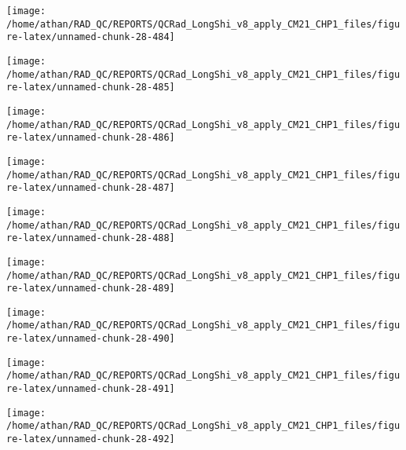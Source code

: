 \documentclass[
  10pt,
  a4paper,oneside]{article}
\begin{document}
\begin{center}\texttt{[image: /home/athan/RAD\_QC/REPORTS/QCRad\_LongShi\_v8\_apply\_CM21\_CHP1\_files/figure-latex/unnamed-chunk-28-484]} \end{center}

\begin{center}\texttt{[image: /home/athan/RAD\_QC/REPORTS/QCRad\_LongShi\_v8\_apply\_CM21\_CHP1\_files/figure-latex/unnamed-chunk-28-485]} \end{center}

\begin{center}\texttt{[image: /home/athan/RAD\_QC/REPORTS/QCRad\_LongShi\_v8\_apply\_CM21\_CHP1\_files/figure-latex/unnamed-chunk-28-486]} \end{center}

\begin{center}\texttt{[image: /home/athan/RAD\_QC/REPORTS/QCRad\_LongShi\_v8\_apply\_CM21\_CHP1\_files/figure-latex/unnamed-chunk-28-487]} \end{center}

\begin{center}\texttt{[image: /home/athan/RAD\_QC/REPORTS/QCRad\_LongShi\_v8\_apply\_CM21\_CHP1\_files/figure-latex/unnamed-chunk-28-488]} \end{center}

\begin{center}\texttt{[image: /home/athan/RAD\_QC/REPORTS/QCRad\_LongShi\_v8\_apply\_CM21\_CHP1\_files/figure-latex/unnamed-chunk-28-489]} \end{center}

\begin{center}\texttt{[image: /home/athan/RAD\_QC/REPORTS/QCRad\_LongShi\_v8\_apply\_CM21\_CHP1\_files/figure-latex/unnamed-chunk-28-490]} \end{center}

\begin{center}\texttt{[image: /home/athan/RAD\_QC/REPORTS/QCRad\_LongShi\_v8\_apply\_CM21\_CHP1\_files/figure-latex/unnamed-chunk-28-491]} \end{center}

\begin{center}\texttt{[image: /home/athan/RAD\_QC/REPORTS/QCRad\_LongShi\_v8\_apply\_CM21\_CHP1\_files/figure-latex/unnamed-chunk-28-492]} \end{center}
\end{document}
